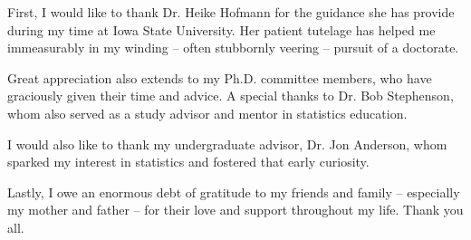 
First, I would like to thank Dr. Heike Hofmann for the guidance she has provide during my time at Iowa State University. Her patient tutelage has helped me immeasurably in my winding -- often stubbornly veering -- pursuit of a doctorate. 

Great appreciation also extends to my Ph.D. committee members, who have graciously given their time and advice. A special thanks to Dr. Bob Stephenson, whom also served as a study advisor and mentor in statistics education. 

I would also like to thank my undergraduate advisor, Dr. Jon Anderson, whom sparked my interest in statistics and fostered that early curiosity. 

Lastly, I owe an enormous debt of gratitude to my friends and family -- especially my mother and father -- for their love and support throughout my life. Thank you all. 